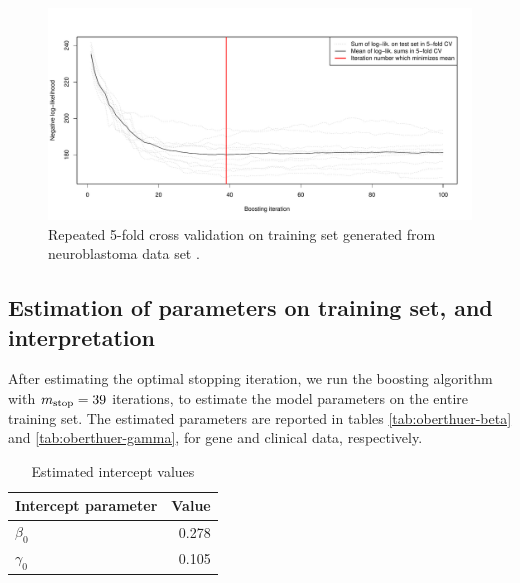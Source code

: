 \begin{figure}\label{fig:neuroblastoma-cv}
\caption{Repeated 5-fold cross validation on training set generated from neuroblastoma data set \citep{oberthuer-data}.}
\centering\includegraphics[scale=0.4]{figures/oberthuer_CVK5_01.pdf}
\end{figure}

\subsection{Estimation of parameters on training set, and interpretation}
After estimating the optimal stopping iteration, we run the boosting algorithm with $m_{\text{stop}}=39$ iterations, to estimate the model parameters on the entire training set.
The estimated parameters are reported in tables \ref{tab:oberthuer-beta} and \ref{tab:oberthuer-gamma}, for gene and clinical data, respectively.
\begin{table}\label{tab:neuroblastoma-intercepts}
\caption{Estimated intercept values}
\begin{tabular}{l|r}
Intercept parameter & Value\\
\hline
$\beta_0$ & 0.278 \\
$\gamma_0$ & 0.105
\end{tabular}
\end{table}

